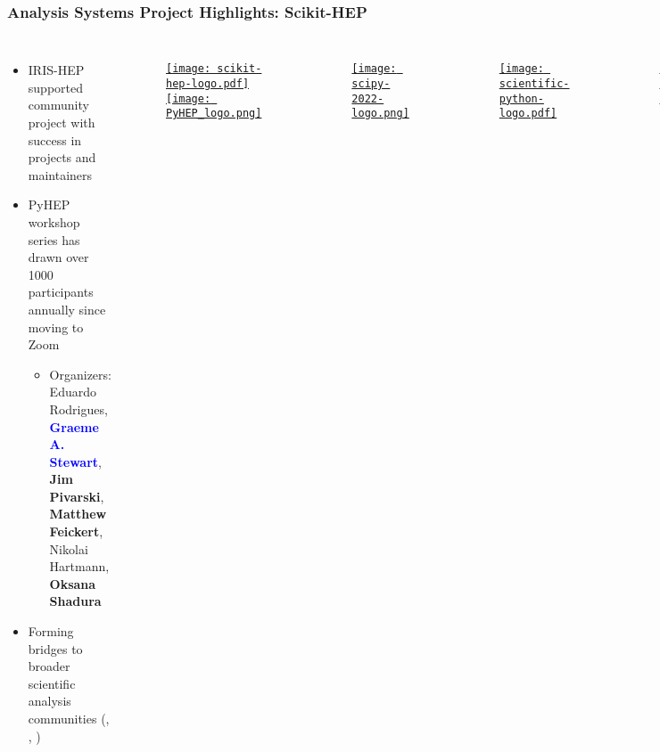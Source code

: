 \begin{frame}
  \frametitle{Analysis Systems Project Highlights: Scikit-HEP}

  \begin{columns}
    \begin{itemize}
      \item IRIS-HEP supported community project with success in projects and maintainers
      \item PyHEP workshop series has drawn over 1000 participants annually since moving to Zoom
      \begin{itemize}
        \item {\small {} Organizers: Eduardo Rodrigues, \textcolor{blue}{\textbf{Graeme A. Stewart}}, \textbf{Jim Pivarski}, \textbf{Matthew Feickert}, Nikolai Hartmann, \textbf{Oksana Shadura}}
      \end{itemize}
      \item Forming bridges to broader scientific analysis communities (, , )
    \end{itemize}
%
    \begin{figure}
        \begin{center}
            \href{https://scikit-hep.org/}{\texttt{[image: scikit-hep-logo.pdf]}}
            \href{https://indico.cern.ch/event/1150631/}{\texttt{[image: PyHEP\_logo.png]}}
        \end{center}
    \end{figure}
    \begin{figure}
        \begin{center}
            \href{https://www.scipy2022.scipy.org/}{\texttt{[image: scipy-2022-logo.png]}}
        \end{center}
    \end{figure}
    \begin{figure}
        \begin{center}
            \href{https://scientific-python.org/}{\texttt{[image: scientific-python-logo.pdf]}}
        \end{center}
    \end{figure}
    \begin{figure}
        \begin{center}
            \href{https://numfocus.org/}{\texttt{[image: NumFOCUS-logo.pdf]}}
        \end{center}
    \end{figure}
  \end{columns}



\end{frame}
